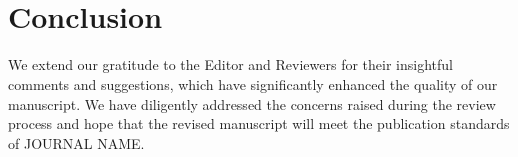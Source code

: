 
\\
\\
\section*{Conclusion}
We extend our gratitude to the Editor and Reviewers for their insightful comments and suggestions, which have significantly enhanced the quality of our manuscript. We have diligently addressed the concerns raised during the review process and hope that the revised manuscript will meet the publication standards of JOURNAL NAME.\\
